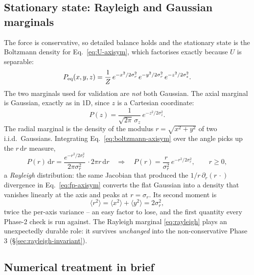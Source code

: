 \documentclass[11pt]{article}
\newcommand{\dd}{\mathrm{d}}
\newcommand{\avg}[1]{\langle #1 \rangle}
\begin{document}
\subsection{Stationary state: Rayleigh and Gaussian marginals}
\label{sec:rayleigh}

The force is conservative, so detailed balance holds and the stationary state is the Boltzmann density for Eq.~\eqref{eq:U-axisym}, which factorises exactly because $U$ is separable:
\begin{equation}
P_{\rm eq}(x,y,z) = \frac{1}{Z}\,
e^{-x^2/2\sigma_r^2}\,e^{-y^2/2\sigma_r^2}\,e^{-z^2/2\sigma_z^2}.
\label{eq:boltzmann-axisym}
\end{equation}
The two marginals used for validation are \emph{not} both Gaussian. The axial marginal is Gaussian, exactly as in 1D, since $z$ is a Cartesian coordinate:
\begin{equation}
P(z) = \frac{1}{\sqrt{2\pi}\,\sigma_z}\,e^{-z^2/2\sigma_z^2}.
\end{equation}
The radial marginal is the density of the modulus $r = \sqrt{x^2+y^2}$ of two i.i.d.\ Gaussians. Integrating Eq.~\eqref{eq:boltzmann-axisym} over the angle picks up the $r\,\dd r$ measure,
\begin{equation}
P(r)\,\dd r = \frac{e^{-r^2/2\sigma_r^2}}{2\pi\sigma_r^2}\,\cdot 2\pi r\,\dd r
\quad\Longrightarrow\quad
P(r) = \frac{r}{\sigma_r^2}\,e^{-r^2/2\sigma_r^2},
\qquad r \ge 0,
\label{eq:rayleigh}
\end{equation}
a \emph{Rayleigh} distribution: the same Jacobian that produced the $1/r\,\partial_r(r\,\cdot)$ divergence in Eq.~\eqref{eq:fp-axisym} converts the flat Gaussian into a density that vanishes linearly at the axis and peaks at $r = \sigma_r$. Its second moment is
\begin{equation}
\avg{r^2} = \avg{x^2} + \avg{y^2} = 2\sigma_r^2,
\end{equation}
twice the per-axis variance -- an easy factor to lose, and the first quantity every Phase-2 check is run against. The Rayleigh marginal \eqref{eq:rayleigh} plays an unexpectedly durable role: it survives \emph{unchanged} into the non-conservative Phase 3 (\S\ref{sec:rayleigh-invariant}).

\subsection{Numerical treatment in brief}
\end{document}
